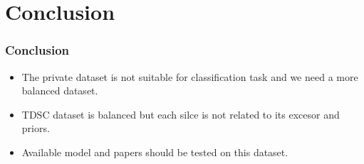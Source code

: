 \documentclass{beamer}
\begin{document}
\section{Conclusion}
\begin{frame}
	\frametitle{Conclusion}
	\begin{itemize}
		\item The private dataset is not suitable for classification task and we  need a more balanced dataset.
		\item TDSC dataset is balanced but each silce is not related to its excesor and priors.
		\item Available model and papers should be tested on this dataset.
	\end{itemize}
\end{frame}
\end{document}

